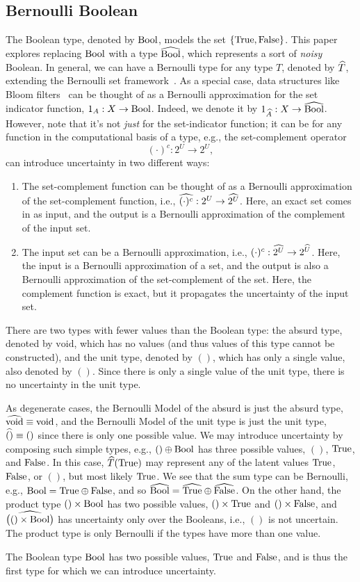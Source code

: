 \documentclass[../main.tex]{subfiles}
\begin{document}
\subsection{Bernoulli Boolean}

The Boolean type, denoted by $\mathrm{Bool}$, models the set $\{\mathrm{True},\mathrm{False}\}$. This paper explores replacing $\mathrm{Bool}$ with a type $\widehat{\mathrm{Bool}}$, which represents a sort of \emph{noisy} Boolean. In general, we can have a Bernoulli type for any type $T$, denoted by $\widehat{T}$, extending the Bernoulli set framework~\cite{bernoulliSets}. As a special case, data structures like Bloom filters~\cite{bloom1970} can be thought of as a Bernoulli approximation for the set indicator function, $1_A : X \to \mathrm{Bool}$. Indeed, we denote it by $1_{\widehat{A}} : X \to \widehat{\mathrm{Bool}}$. However, note that it's not \emph{just} for the set-indicator function; it can be for any function in the computational basis of a type, e.g., the set-complement operator
$$
(\cdot)^c : 2^U \to 2^U,
$$
can introduce uncertainty in two different ways:
\begin{enumerate}
\item The set-complement function can be thought of as a Bernoulli approximation of the set-complement function, i.e., $\widehat{(\cdot)^c} : 2^U \to \widehat{2^U}$. Here, an exact set comes in as input, and the output is a Bernoulli approximation of the complement of the input set.
\item The input set can be a Bernoulli approximation, i.e., $(\cdot)^c : \widehat{2^U} \to 2^{\widehat{U}}$. Here, the input is a Bernoulli approximation of a set, and the output is also a Bernoulli approximation of the set-complement of the set. Here, the complement function is exact, but it propagates the uncertainty of the input set.
\end{enumerate}

There are two types with fewer values than the Boolean type: the absurd type, denoted by $\mathrm{void}$, which has no values (and thus values of this type cannot be constructed), and the unit type, denoted by $()$, which has only a single value, also denoted by $()$. Since there is only a single value of the unit type, there is no uncertainty in the unit type.

As degenerate cases, the Bernoulli Model of the absurd is just the absurd type, $\widehat{\mathrm{void}} \equiv \mathrm{void}$, and the Bernoulli Model of the unit type is just the unit type, $\widehat{()} \equiv ()$ since there is only one possible value. We may introduce uncertainty by composing such simple types, e.g., $() \oplus \mathrm{Bool}$ has three possible values, $()$, $\mathrm{True}$, and $\mathrm{False}$. In this case, $\widehat{T}(\mathrm{True})$ may represent any of the latent values $\mathrm{True}$, $\mathrm{False}$, or $()$, but most likely $\mathrm{True}$. We see that the sum type can be Bernoulli, e.g., $\mathrm{Bool} = \mathrm{True} \oplus \mathrm{False}$,
and so $\widehat{\mathrm{Bool}} = \widehat{\mathrm{True}} \oplus \widehat{\mathrm{False}}$. On the other hand, the product type $() \times \mathrm{Bool}$ has two possible values, $() \times \mathrm{True}$ and $() \times \mathrm{False}$, and $\widehat{\bigl( () \times \mathrm{Bool} \bigr)}$ has uncertainty only over the Booleans, i.e., $()$ is not uncertain. The product type is only Bernoulli if the types have more than one value.

The Boolean type $\mathrm{Bool}$ has two possible values, $\mathrm{True}$ and $\mathrm{False}$, and is thus the first type for which we can introduce uncertainty.
\end{document}
